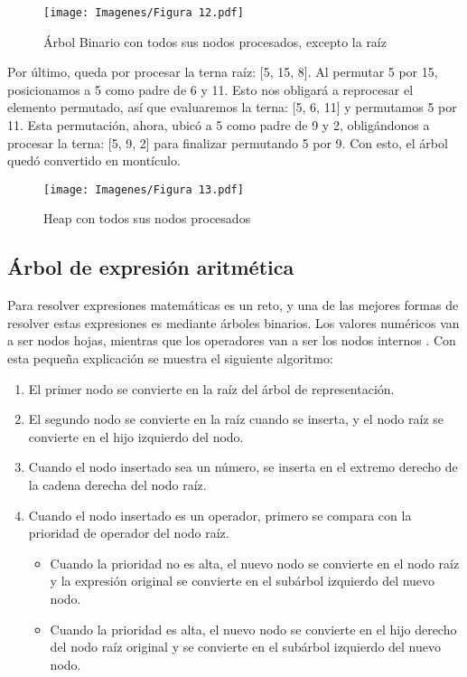\documentclass[12pt]{article}
\begin{document}
\begin{figure}[H]
   \centering
   \texttt{[image: Imagenes/Figura 12.pdf]}
   \caption{Árbol Binario con todos sus nodos procesados, excepto la raíz}
   \label{fig_label4}
\end{figure}

Por último, queda por procesar la terna raíz: [5, 15, 8]. Al permutar 5 por 15, posicionamos a 5 como padre de 6 y 11. Esto nos obligará a reprocesar el elemento permutado, así que evaluaremos la terna: [5, 6, 11] y permutamos 5 por 11. Esta permutación, ahora, ubicó a 5 como padre de 9 y 2, obligándonos a procesar la terna: [5, 9, 2] para finalizar permutando 5 por 9. Con esto, el árbol quedó convertido en montículo.

\begin{figure}[H]
   \centering
   \texttt{[image: Imagenes/Figura 13.pdf]}
   \caption{Heap con todos sus nodos procesados}
   \label{fig_label5}
\end{figure}

\subsection{Árbol de expresión aritmética}

Para resolver expresiones matemáticas es un reto, y una de las mejores formas de resolver estas expresiones es mediante árboles binarios. Los valores numéricos van a ser nodos hojas, mientras que los operadores van a ser los nodos internos . Con esta pequeña explicación se muestra el siguiente algoritmo:

\begin{enumerate}
    \item El primer nodo se convierte en la raíz del árbol de representación.
    \item El segundo nodo se convierte en la raíz cuando se inserta, y el nodo raíz se convierte en el hijo izquierdo del nodo.
    \item Cuando el nodo insertado sea un número, se inserta en el extremo derecho de la cadena derecha del nodo raíz.
    \item Cuando el nodo insertado es un operador, primero se compara con la prioridad de operador del nodo raíz.
    \begin{itemize}
        \item Cuando la prioridad no es alta, el nuevo nodo se convierte en el nodo raíz y la expresión original se convierte en el subárbol izquierdo del nuevo nodo.
        \item Cuando la prioridad es alta, el nuevo nodo se convierte en el hijo derecho del nodo raíz original y se convierte en el subárbol izquierdo del nuevo nodo.
    \end{itemize}
\end{enumerate}
\end{document}
